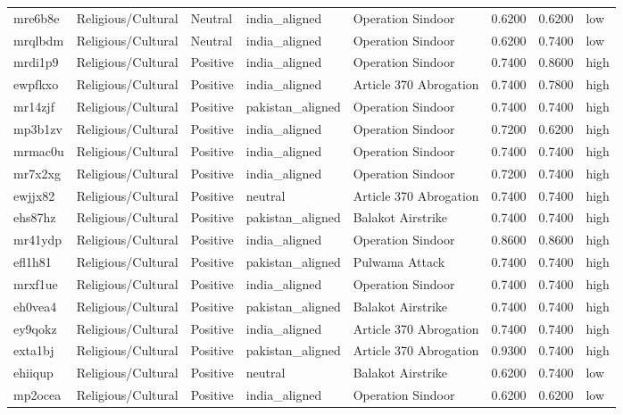 \begin{longtable}{lllllrrl}
mre6b8e & Religious/Cultural & Neutral & india\_aligned & Operation Sindoor & 0.6200 & 0.6200 & low \\
mrqlbdm & Religious/Cultural & Neutral & india\_aligned & Operation Sindoor & 0.6200 & 0.7400 & low \\
mrdi1p9 & Religious/Cultural & Positive & india\_aligned & Operation Sindoor & 0.7400 & 0.8600 & high \\
ewpfkxo & Religious/Cultural & Positive & india\_aligned & Article 370 Abrogation & 0.7400 & 0.7800 & high \\
mr14zjf & Religious/Cultural & Positive & pakistan\_aligned & Operation Sindoor & 0.7400 & 0.7400 & high \\
mp3b1zv & Religious/Cultural & Positive & india\_aligned & Operation Sindoor & 0.7200 & 0.6200 & high \\
mrmac0u & Religious/Cultural & Positive & india\_aligned & Operation Sindoor & 0.7400 & 0.7400 & high \\
mr7x2xg & Religious/Cultural & Positive & india\_aligned & Operation Sindoor & 0.7200 & 0.7400 & high \\
ewjjx82 & Religious/Cultural & Positive & neutral & Article 370 Abrogation & 0.7400 & 0.7400 & high \\
ehs87hz & Religious/Cultural & Positive & pakistan\_aligned & Balakot Airstrike & 0.7400 & 0.7400 & high \\
mr41ydp & Religious/Cultural & Positive & india\_aligned & Operation Sindoor & 0.8600 & 0.8600 & high \\
efl1h81 & Religious/Cultural & Positive & pakistan\_aligned & Pulwama Attack & 0.7400 & 0.7400 & high \\
mrxf1ue & Religious/Cultural & Positive & india\_aligned & Operation Sindoor & 0.7400 & 0.7400 & high \\
eh0vea4 & Religious/Cultural & Positive & pakistan\_aligned & Balakot Airstrike & 0.7400 & 0.7400 & high \\
ey9qokz & Religious/Cultural & Positive & india\_aligned & Article 370 Abrogation & 0.7400 & 0.7400 & high \\
exta1bj & Religious/Cultural & Positive & pakistan\_aligned & Article 370 Abrogation & 0.9300 & 0.7400 & high \\
ehiiqup & Religious/Cultural & Positive & neutral & Balakot Airstrike & 0.6200 & 0.7400 & low \\
mp2ocea & Religious/Cultural & Positive & india\_aligned & Operation Sindoor & 0.6200 & 0.6200 & low \\

\end{longtable}
